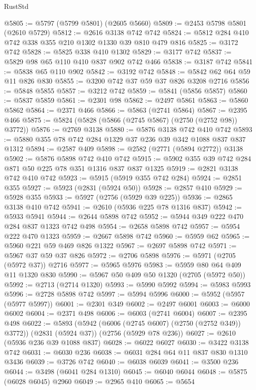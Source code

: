 \begin{lexlean}{RustStd}
\begin{coremodule}
@5805 := @5797 (@5799 @5801) (@2605 @5660)
@5809 := @2453 @5798 @5801 (@2610 @5729)
@5812 := @2616 @3138 @742 @742
@5824 := @5812 @284 @410 @742 @338 @355 @210 @1302 @1330 @39 @810 @479 @816
@5825 := @3172 @742
@5828 := @5825 @338 @410 @1302
@5829 := @3177 @742
@5837 := @5829 @98 @65 @110 @410 @837 @902 @742 @466
@5838 := @3187 @742
@5841 := @5838 @65 @110 @902
@5842 := @3192 @742
@5848 := @5842 @62 @64 @59 @11 @826 @830
@5855 := @3200 @742 @37 @59 @37 @826 @3208 @2716
@5856 := @5848 @5855
@5857 := @3212 @742
@5859 := @5841 (@5856 @5857)
@5860 := @5837 @5859
@5861 := @2301 @98
@5862 := @2497 @5861
@5863 := @5860 @5862
@5864 := @2371 @466
@5866 := @5863 (@2741 @5864)
@5867 := @2395 @466
@5875 := @5824 (@5828 (@5866 (@2745 @5867) (@2750 (@2752 @98)) @3772))
@5876 := @2769 @3138
@5880 := @5876 @3138 @742 @410 @742
@5893 := @5880 @355 @78 @742 @284 @1329 @37 @236 @39 @342 @1088 @837 @837 @1312
@5894 := @2587 @409
@5898 := @2582 (@2771 (@5894 @2772)) @3138
@5902 := @5876 @5898 @742 @410 @742
@5915 := @5902 @355 @39 @742 @284 @871 @50 @225 @78 @351 @1316 @837 @837 @1325
@5919 := @2821 @3138 @742 @410 @742
@5923 := @5915 (@5919 @355 @742 @284)
@5924 := @2851 @355
@5927 := @5923 (@2831 (@5924 @50))
@5928 := @2857 @410
@5929 := @5928 @355
@5933 := @5927 (@2756 (@5929 @39 @225))
@5936 := @2865 @3138 @410 @742
@5941 := @2610 (@5936 @225 @78 @1316 @837)
@5942 := @5933 @5941
@5944 := @2644 @5898 @742
@5952 := @5944 @349 @222 @470 @284 @837 @1323 @742 @498
@5954 := @2658 @5898 @742
@5957 := @5954 @222 @470 @1323
@5959 := @2667 @5898 @742
@5960 := @5959 @62
@5965 := @5960 @221 @59 @469 @826 @1322
@5967 := @2697 @5898 @742
@5971 := @5967 @37 @59 @37 @826
@5972 := @2706 @5898
@5976 := @5971 (@2705 (@5972 @37)) @2716
@5977 := @5965 @5976
@5983 := @5959 @80 @64 @409 @11 @1320 @830
@5990 := @5967 @50 @409 @50 @1320 (@2705 (@5972 @50))
@5992 := @2713 (@2714 @1320)
@5993 := @5990 @5992
@5994 := @5983 @5993
@5996 := @2728 @5898 @742
@5997 := @5994 @5996
@6000 := @5952 (@5957 (@5977 @5997))
@6001 := @2301 @349
@6002 := @2497 @6001
@6003 := @6000 @6002
@6004 := @2371 @498
@6006 := @6003 (@2741 @6004)
@6007 := @2395 @498
@6022 := @5893
    (@5942 (@6006 (@2745 @6007) (@2750 (@2752 @349)) @3772))
    (@2831 (@5924 @37))
    (@2756 (@5929 @78 @236))
@6027 := @2610 (@5936 @236 @39 @1088 @837)
@6028 := @6022 @6027
@6030 := @3422 @3138 @742
@6031 := @6030 @236
@6038 := @6031 @284 @64 @11 @837 @830 @1310 @3436
@6039 := @3726 @742
@6040 := @6038 @6039
@6041 := @3500 @236
@6044 := @3498 (@6041 @284 @1310)
@6045 := @6040 @6044
@6048 := @5875 (@6028 @6045) @2960
@6049 := @2965 @410
@6065 := @5654

\end{coremodule}
\end{lexlean}
